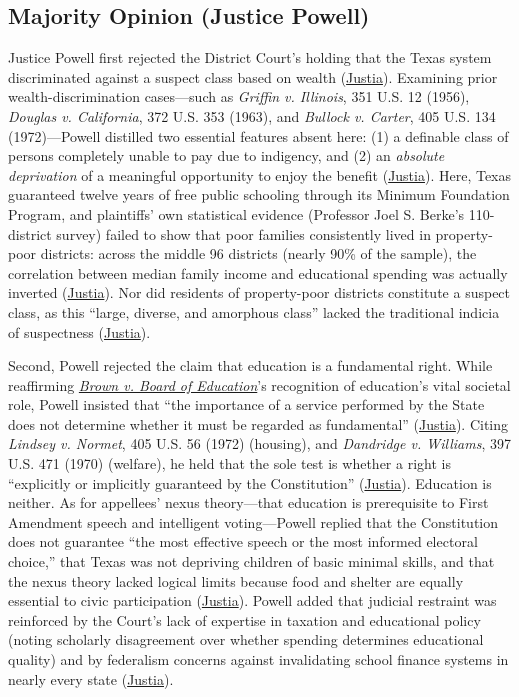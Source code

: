 \documentclass[12pt]{article}
\begin{document}
\subsection{Majority Opinion (Justice Powell)}

Justice Powell first rejected the District Court's holding that the Texas system discriminated against a suspect class based on wealth (\href{https://supreme.justia.com/cases/federal/us/411/1/}{Justia}). Examining prior wealth-discrimination cases---such as \textit{Griffin v. Illinois}, 351 U.S. 12 (1956), \textit{Douglas v. California}, 372 U.S. 353 (1963), and \textit{Bullock v. Carter}, 405 U.S. 134 (1972)---Powell distilled two essential features absent here: (1) a definable class of persons completely unable to pay due to indigency, and (2) an \emph{absolute deprivation} of a meaningful opportunity to enjoy the benefit (\href{https://supreme.justia.com/cases/federal/us/411/1/}{Justia}). Here, Texas guaranteed twelve years of free public schooling through its Minimum Foundation Program, and plaintiffs' own statistical evidence (Professor Joel S. Berke's 110-district survey) failed to show that poor families consistently lived in property-poor districts: across the middle 96 districts (nearly 90\% of the sample), the correlation between median family income and educational spending was actually inverted (\href{https://supreme.justia.com/cases/federal/us/411/1/}{Justia}). Nor did residents of property-poor districts constitute a suspect class, as this ``large, diverse, and amorphous class'' lacked the traditional indicia of suspectness (\href{https://supreme.justia.com/cases/federal/us/411/1/}{Justia}).

Second, Powell rejected the claim that education is a fundamental right. While reaffirming \href{https://supreme.justia.com/cases/federal/us/347/483/}{\textit{Brown v. Board of Education}}'s recognition of education's vital societal role, Powell insisted that ``the importance of a service performed by the State does not determine whether it must be regarded as fundamental'' (\href{https://supreme.justia.com/cases/federal/us/411/1/}{Justia}). Citing \textit{Lindsey v. Normet}, 405 U.S. 56 (1972) (housing), and \textit{Dandridge v. Williams}, 397 U.S. 471 (1970) (welfare), he held that the sole test is whether a right is ``explicitly or implicitly guaranteed by the Constitution'' (\href{https://supreme.justia.com/cases/federal/us/411/1/}{Justia}). Education is neither. As for appellees' nexus theory---that education is prerequisite to First Amendment speech and intelligent voting---Powell replied that the Constitution does not guarantee ``the most effective speech or the most informed electoral choice,'' that Texas was not depriving children of basic minimal skills, and that the nexus theory lacked logical limits because food and shelter are equally essential to civic participation (\href{https://supreme.justia.com/cases/federal/us/411/1/}{Justia}). Powell added that judicial restraint was reinforced by the Court's lack of expertise in taxation and educational policy (noting scholarly disagreement over whether spending determines educational quality) and by federalism concerns against invalidating school finance systems in nearly every state (\href{https://supreme.justia.com/cases/federal/us/411/1/}{Justia}).
\end{document}

